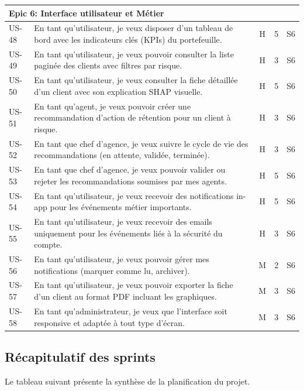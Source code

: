 \begin{footnotesize}
\begin{longtable}{|p{1.2cm}|p{8.5cm}|c|c|c|}
\multicolumn{5}{|l|}{Epic 6: Interface utilisateur et Métier} \\
\hline
US-48 & En tant qu'utilisateur, je veux disposer d'un tableau de bord avec les indicateurs clés (KPIs) du portefeuille. & H & 5 & S6 \\
\hline
US-49 & En tant qu'utilisateur, je veux pouvoir consulter la liste paginée des clients avec filtres par risque. & H & 3 & S6 \\
\hline
US-50 & En tant qu'utilisateur, je veux consulter la fiche détaillée d'un client avec son explication SHAP visuelle. & H & 5 & S6 \\
\hline
US-51 & En tant qu'agent, je veux pouvoir créer une recommandation d'action de rétention pour un client à risque. & H & 3 & S6 \\
\hline
US-52 & En tant que chef d'agence, je veux suivre le cycle de vie des recommandations (en attente, validée, terminée). & H & 3 & S6 \\
\hline
US-53 & En tant que chef d'agence, je veux pouvoir valider ou rejeter les recommandations soumises par mes agents. & H & 5 & S6 \\
\hline
US-54 & En tant qu'utilisateur, je veux recevoir des notifications in-app pour les événements métier importants. & H & 5 & S6 \\
\hline
US-55 & En tant qu'utilisateur, je veux recevoir des emails uniquement pour les événements liés à la sécurité du compte. & H & 3 & S6 \\
\hline
US-56 & En tant qu'utilisateur, je veux pouvoir gérer mes notifications (marquer comme lu, archiver). & M & 2 & S6 \\
\hline
US-57 & En tant qu'utilisateur, je veux pouvoir exporter la fiche d'un client au format PDF incluant les graphiques. & M & 3 & S6 \\
\hline
US-58 & En tant qu'administrateur, je veux que l'interface soit responsive et adaptée à tout type d'écran. & M & 3 & S6 \\
\hline
\end{longtable}
\end{footnotesize}

\subsection{Récapitulatif des sprints}

Le tableau suivant présente la synthèse de la planification du projet.

